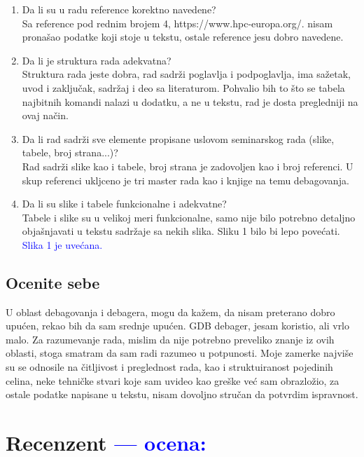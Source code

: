 \documentclass[a4paper]{report}
\newcommand{\odgovor}[1]{\textcolor{blue}{#1}}
\begin{document}
\begin{enumerate}
\item Da li su u radu reference korektno navedene?\\
Sa reference pod rednim brojem 4, https://www.hpc-europa.org/. nisam pronašao podatke koji stoje u tekstu, ostale reference jesu dobro navedene.

\item Da li je struktura rada adekvatna?\\
Struktura rada jeste dobra, rad sadrži poglavlja i podpoglavlja, ima sažetak, uvod i zaključak, sadržaj i deo sa literaturom. Pohvalio bih to što se tabela najbitnih 
komandi nalazi u dodatku, a ne u tekstu, rad je dosta pregledniji na ovaj način.

\item Da li rad sadrži sve elemente propisane uslovom seminarskog rada (slike, tabele, broj strana...)?\\
Rad sadrži slike kao i tabele, broj strana je zadovoljen kao i broj referenci. U skup referenci ukljceno je tri master rada kao i knjige na temu debagovanja.

\item Da li su slike i tabele funkcionalne i adekvatne?\\
Tabele i slike su u velikoj meri funkcionalne, samo nije bilo potrebno detaljno objašnjavati u tekstu sadržaje sa nekih slika. Sliku 1 bilo bi lepo povećati. \odgovor{Slika 1 je uvećana.}
\end{enumerate}


\section{Ocenite sebe}

U oblast debagovanja i  debagera, mogu da kažem, da nisam preterano dobro upućen, rekao bih da sam srednje upućen. GDB debager, jesam koristio, ali vrlo malo. Za razumevanje rada, mislim da nije potrebno preveliko znanje iz ovih oblasti, stoga smatram da sam radi razumeo u potpunosti. Moje zamerke najviše su se odnosile na čitljivost i preglednost rada, kao i struktuiranost pojedinih celina, neke tehničke stvari koje sam uvideo kao greške već sam obrazložio, za ostale podatke napisane u tekstu, nisam dovoljno stručan da potvrdim ispravnost.   

\chapter{Recenzent \odgovor{--- ocena:} }
\end{document}
